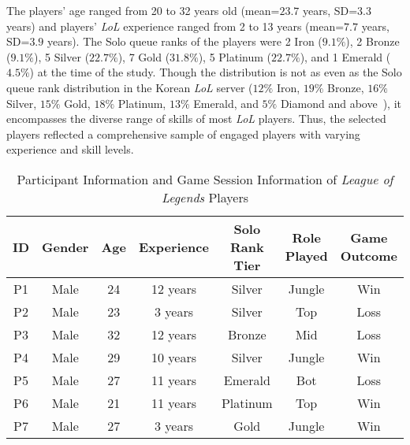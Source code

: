The players' age ranged from 20 to 32 years old (mean=$23.7$ years, SD=$3.3$ years) and players' \textit{LoL} experience ranged from 2 to 13 years (mean=$7.7$ years, SD=$3.9$ years). The Solo queue ranks of the players were 2 Iron ($9.1\%$), 2 Bronze ($9.1\%$), 5 Silver ($22.7\%$), 7 Gold ($31.8\%$), 5 Platinum ($22.7\%$), and 1 Emerald ($4.5\%$) at the time of the study. Though the distribution is not as even as the Solo queue rank distribution in the Korean \textit{LoL} server ($12\%$ Iron, $19\%$ Bronze, $16\%$ Silver, $15\%$ Gold, $18\%$ Platinum, $13\%$ Emerald, and $5\%$ Diamond and above~\cite{log2024}), it encompasses the diverse range of skills of most \textit{LoL} players. Thus, the selected players reflected a comprehensive sample of engaged players with varying experience and skill levels. 


\begin{table*}
\centering
\caption{Participant Information and Game Session Information of \textit{League of Legends} Players}
    \label{table:participant_info}
\begin{tabular}{c|c|c|c|c|c|c} 
\toprule
\textbf{ID} & \textbf{Gender} & \textbf{Age} & \textbf{Experience} & \textbf{Solo Rank Tier} & \textbf{Role Played} & \textbf{Game Outcome}  \\ 
\hline
P1          & Male            & 24           & 12 years            & Silver                  & Jungle               & Win                    \\ 
\hline
P2          & Male            & 23           & 3 years             & Silver                  & Top                  & Loss                   \\ 
\hline
P3          & Male            & 32           & 12 years            & Bronze                  & Mid                  & Loss                   \\ 
\hline
P4          & Male            & 29           & 10 years            & Silver                  & Jungle               & Win                    \\ 
\hline
P5          & Male            & 27           & 11 years            & Emerald                 & Bot                  & Loss                   \\ 
\hline
P6          & Male            & 21           & 11 years            & Platinum                & Top                  & Win                    \\ 
\hline
P7          & Male            & 27           & 3 years             & Gold                    & Jungle               & Win                    \\ 

\end{tabular}
\end{table*}

